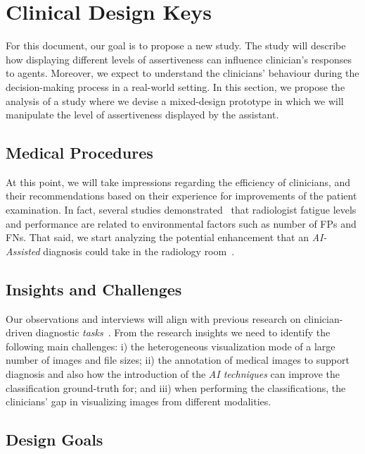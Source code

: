 \section{Clinical Design Keys}
\label{sec:sec003}

For this document, our goal is to propose a new study.
The study will describe how displaying different levels of assertiveness can influence clinician's responses to agents.
Moreover, we expect to understand the clinicians' behaviour during the decision-making process in a real-world setting.
In this section, we propose the analysis of a study where we devise a mixed-design prototype in which we will manipulate the level of assertiveness displayed by the assistant.

\subsection{Medical Procedures}
\label{sec:sec00301}

At this point, we will take impressions regarding the efficiency of clinicians, and their recommendations based on their experience for improvements of the patient examination.
In fact, several studies demonstrated~\cite{waite2017tired} that radiologist fatigue levels and performance are related to environmental factors such as number of FPs and FNs.
That said, we start analyzing the potential enhancement that an {\it AI-Assisted} diagnosis could take in the radiology room~\cite{chatelain2018evaluation, miglioretti2007radiologist}.

\subsection{Insights and Challenges}
\label{sec:sec00302}

Our observations and interviews will align with previous research on clinician-driven diagnostic {\it tasks}~\cite{Sultanum:2018:MTP:3173574.3173996}.
From the research insights we need to identify the following main challenges:
i) the heterogeneous visualization mode of a large number of images and file sizes;
ii) the annotation of medical images to support diagnosis and also 
how the introduction of the {\it AI techniques} can improve the classification ground-truth for; and
iii) when performing the classifications, the clinicians' gap in visualizing images from different modalities.

\subsection{Design Goals}
\label{sec:sec00303}

